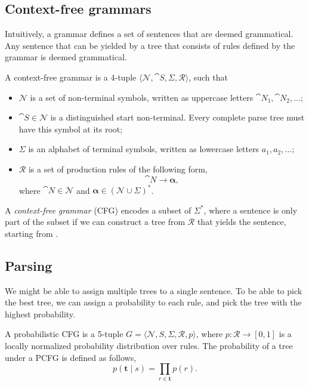 \subsection{Context-free grammars}

Intuitively, a grammar defines a set of sentences that are deemed
grammatical. Any sentence that can be yielded by a tree that consists of
rules defined by the grammar is deemed grammatical.

\begin{definition}
  A context-free grammar is a 4-tuple $\langle \mathcal{N}, \cat{S},
  \Sigma,\mathcal{R} \rangle$, such that
  \begin{itemize}
    \item $\mathcal{N}$ is a set of non-terminal symbols, written as uppercase
      letters $\cat{N}_1, \cat{N}_2, \ldots$;
    \item $\cat{S} \in \mathcal{N}$ is a distinguished start non-terminal.
      Every complete parse tree must have this symbol at its root;
    \item $\Sigma$ is an alphabet of terminal symbols, written as lowercase
      letters $a_1,a_2,\ldots$;
    \item $\mathcal{R}$ is a set of production rules of the following form, \[
        \cat{N} \to \bm{\alpha}
      ,\]
      where $\cat{N}\in\mathcal{N}$ and $\bm{\alpha}\in (\mathcal{N} \cup
      \Sigma)^*$.
  \end{itemize}
\end{definition}

A \textit{context-free grammar} (CFG) encodes a subset of $\Sigma^*$, where a
sentence is only part of the subset if we can construct a tree from
$\mathcal{R}$ that yields the sentence, starting from .

\subsection{Parsing}

We might be able to assign multiple trees to a single sentence. To be able to
pick the best tree, we can assign a probability to each rule, and pick the
tree with the highest probability.

\begin{definition}
  A probabilistic CFG is a 5-tuple $G=\langle \mathcal{N}, S,
  \Sigma,\mathcal{R}, p \rangle$, where $p: \mathcal{R}\to [0,1]$ is a locally
  normalized probability distribution over rules. The probability of a tree
  under a PCFG is defined as follows, \[
    p(\bm{t} \mid s) = \prod_{r\in\bm{t}} p(r)
  .\]
\end{definition}


